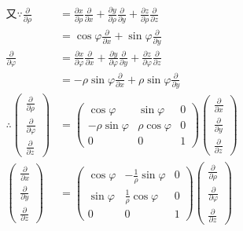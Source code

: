 \documentclass[12pt, UTF8, AutoFakeBold]{ctexart} %
\begin{document}
\begin{align*}
    \text{又}\because
    \frac{\partial}{\partial\rho} &= \frac{\partial x}{\partial\rho}\frac{\partial}{\partial x}
    + \frac{\partial y}{\partial\rho}\frac{\partial}{\partial y}
    + \frac{\partial z}{\partial\rho}\frac{\partial}{\partial z}\\
    &= \cos\varphi\frac{\partial}{\partial x} + \sin\varphi\frac{\partial}{\partial y}\\
    \frac{\partial}{\partial\varphi} &= \frac{\partial x}{\partial\varphi}\frac{\partial}{\partial x}
    + \frac{\partial y}{\partial\varphi}\frac{\partial}{\partial y}
    + \frac{\partial z}{\partial\varphi}\frac{\partial}{\partial z}\\
    &= -\rho\sin\varphi\frac{\partial}{\partial x} + \rho\sin\varphi\frac{\partial}{\partial y}\\
    \therefore
    \begin{pmatrix}
        \frac{\partial}{\partial\rho}\\
        \frac{\partial}{\partial\varphi}\\
        \frac{\partial}{\partial z}
    \end{pmatrix}
    &=
    \begin{pmatrix}
        \cos\varphi & \sin\varphi & 0\\
        -\rho\sin\varphi & \rho\cos\varphi & 0\\
        0 & 0 & 1
    \end{pmatrix}
    \begin{pmatrix}
        \frac{\partial}{\partial x}\\
        \frac{\partial}{\partial y}\\
        \frac{\partial}{\partial z}
    \end{pmatrix}\\
    \begin{pmatrix}
        \frac{\partial}{\partial x}\\
        \frac{\partial}{\partial y}\\
        \frac{\partial}{\partial z}
    \end{pmatrix}
    &=
    \begin{pmatrix}
        \cos\varphi & -\frac{1}{\rho}\sin\varphi & 0\\
        \sin\varphi & \frac{1}{\rho}\cos\varphi & 0\\
        0 & 0 & 1
    \end{pmatrix}
    \begin{pmatrix}
        \frac{\partial}{\partial\rho}\\
        \frac{\partial}{\partial\varphi}\\
        \frac{\partial}{\partial z}
    \end{pmatrix}
\end{align*}
\end{document}
